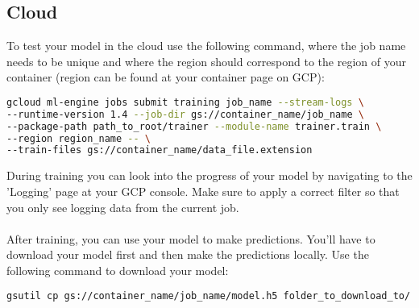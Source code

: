 \documentclass{article}
\begin{document}
\subsection{Cloud}
To test your model in the cloud use the following command, where the job name needs to be unique and where the region should correspond to the region of your container (region can be found at your container page on GCP):
\begin{lstlisting}[language=Bash]
gcloud ml-engine jobs submit training job_name --stream-logs \
--runtime-version 1.4 --job-dir gs://container_name/job_name \
--package-path path_to_root/trainer --module-name trainer.train \
--region region_name -- \
--train-files gs://container_name/data_file.extension
\end{lstlisting}
During training you can look into the progress of your model by navigating to the 'Logging' page at your GCP console. Make sure to apply a correct filter so that you only see logging data from the current job.
\\
\\
After training, you can use your model to make predictions. You'll have to download your model first and then make the predictions locally. Use the following command to download your model:
\begin{lstlisting}[language=Bash]
gsutil cp gs://container_name/job_name/model.h5 folder_to_download_to/
\end{lstlisting}
\end{document}
